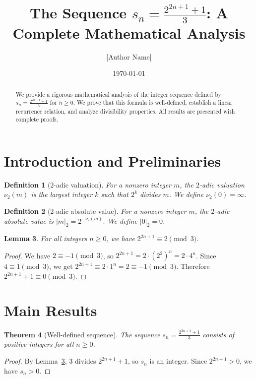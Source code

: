 \documentclass[11pt]{article}
\title{The Sequence $s_n = \frac{2^{2n+1} + 1}{3}$: A Complete Mathematical Analysis}
\author{[Author Name]}
\date{\today}
\newtheorem{theorem}{Theorem}[section]
\newtheorem{lemma}[theorem]{Lemma}
\newtheorem{definition}[theorem]{Definition}
\theoremstyle{definition}
\begin{document}
\maketitle

\begin{abstract}
We provide a rigorous mathematical analysis of the integer sequence defined by $s_n = \frac{2^{2n+1} + 1}{3}$ for $n \geq 0$. We prove that this formula is well-defined, establish a linear recurrence relation, and analyze divisibility properties. All results are presented with complete proofs.
\end{abstract}

\section{Introduction and Preliminaries}

\begin{definition}[$2$-adic valuation]
For a nonzero integer $m$, the $2$-adic valuation $\nu_2(m)$ is the largest integer $k$ such that $2^k$ divides $m$. We define $\nu_2(0) = \infty$.
\end{definition}

\begin{definition}[$2$-adic absolute value]
For a nonzero integer $m$, the $2$-adic absolute value is $|m|_2 = 2^{-\nu_2(m)}$. We define $|0|_2 = 0$.
\end{definition}

\begin{lemma}\label{lem:div3}
For all integers $n \geq 0$, we have $2^{2n+1} \equiv 2 \pmod{3}$.
\end{lemma}

\begin{proof}
We have $2 \equiv -1 \pmod{3}$, so $2^{2n+1} = 2 \cdot (2^2)^n = 2 \cdot 4^n$. Since $4 \equiv 1 \pmod{3}$, we get $2^{2n+1} \equiv 2 \cdot 1^n = 2 \equiv -1 \pmod{3}$. Therefore $2^{2n+1} + 1 \equiv 0 \pmod{3}$.
\end{proof}

\section{Main Results}

\begin{theorem}[Well-defined sequence]
The sequence $s_n = \frac{2^{2n+1} + 1}{3}$ consists of positive integers for all $n \geq 0$.
\end{theorem}

\begin{proof}
By Lemma~\ref{lem:div3}, $3$ divides $2^{2n+1} + 1$, so $s_n$ is an integer. Since $2^{2n+1} > 0$, we have $s_n > 0$.
\end{proof}
\end{document}
